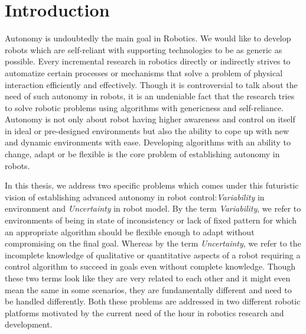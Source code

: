 \documentclass[a4paper,11pt,twoside]{StyleThese}
\begin{document}
\fi
\chapter*{Introduction}
Autonomy is undoubtedly the main goal in Robotics. We would like to develop robots which are self-reliant with supporting technologies to be as generic as possible. Every incremental research in robotics  directly or indirectly strives to automatize certain processes or mechanisms that solve a problem of physical interaction efficiently and effectively. Though it is controversial to talk about the need of such autonomy in robots, it is an undeniable fact that the research tries to solve robotic problems using algorithms with genericness and self-reliance. Autonomy is not only about robot having higher awareness and control on itself in ideal or pre-designed environments but also the ability to cope up with new and dynamic environments with ease. Developing algorithms with an ability to change, adapt or be flexible is the core problem of establishing autonomy in robots. 

In this thesis, we address two specific problems which comes under this futuristic vision of establishing advanced autonomy in robot control:\textit{Variability} in environment and \textit{Uncertainty} in robot model. By the term \textit{Variability}, we refer to environments of being in state of inconsistency or lack of fixed pattern for which an appropriate algorithm should be flexible enough to adapt without compromising on the final goal. Whereas by the term \textit{Uncertainty}, we refer to the incomplete knowledge of qualitative or quantitative aspects of a robot requiring a control algorithm to succeed in goals even without complete knowledge. Though these two terms look like they are very related to each other and it might even mean the same in some scenarios, they are fundamentally different and need to be handled differently. Both these problems are addressed in two different robotic platforms motivated by the current need of the hour in robotics research and development.
\end{document}

